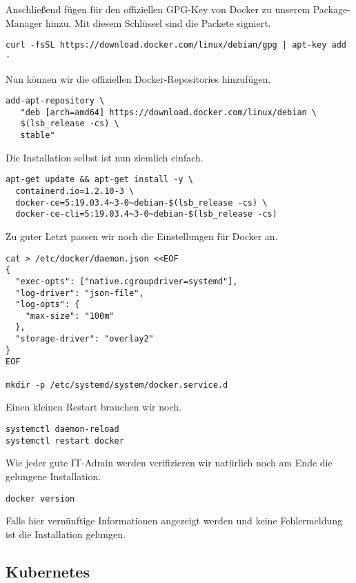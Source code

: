 Anschließend fügen für den offiziellen GPG-Key von Docker zu unserem
Package-Manager hinzu. Mit diesem Schlüssel sind die Packete signiert.

\begin{verbatim}
curl -fsSL https://download.docker.com/linux/debian/gpg | apt-key add -
\end{verbatim}

Nun können wir die offiziellen Docker-Repositories hinzufügen.

\begin{verbatim}
add-apt-repository \
   "deb [arch=amd64] https://download.docker.com/linux/debian \
   $(lsb_release -cs) \
   stable"
\end{verbatim}

Die Installation selbst ist nun ziemlich einfach.

\begin{verbatim}
apt-get update && apt-get install -y \
  containerd.io=1.2.10-3 \
  docker-ce=5:19.03.4~3-0~debian-$(lsb_release -cs) \
  docker-ce-cli=5:19.03.4~3-0~debian-$(lsb_release -cs)
\end{verbatim}

Zu guter Letzt passen wir noch die Einstellungen für Docker an.

\begin{verbatim}
cat > /etc/docker/daemon.json <<EOF
{
  "exec-opts": ["native.cgroupdriver=systemd"],
  "log-driver": "json-file",
  "log-opts": {
    "max-size": "100m"
  },
  "storage-driver": "overlay2"
}
EOF

mkdir -p /etc/systemd/system/docker.service.d
\end{verbatim}

Einen kleinen Restart brauchen wir noch.

\begin{verbatim}
systemctl daemon-reload
systemctl restart docker
\end{verbatim}

Wie jeder gute IT-Admin werden verifizieren wir natürlich noch am Ende
die gelungene Installation.

\begin{verbatim}
docker version
\end{verbatim}

Falls hier vernünftige Informationen angezeigt werden und keine
Fehlermeldung ist die Installation gelungen.

\hypertarget{kubernetes-1}{%
\subsection{Kubernetes}\label{kubernetes-1}}

